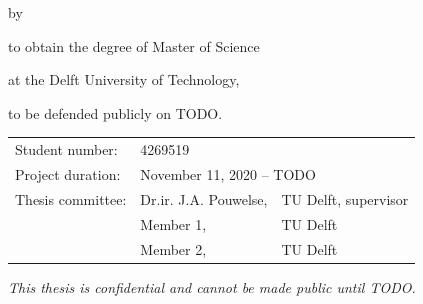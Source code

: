\documentclass[whitelogo]{tudelft-report}
\begin{document}
\begin{titlepage}

\begin{center}


{\makeatletter
\largetitlestyle\fontsize{64}{94}\selectfont\@title
\makeatother}

{\makeatletter
\ifx\@subtitle\undefined\else
    \bigskip
   {\tudsffamily\fontsize{22}{32}\selectfont\@subtitle}
\fi
\makeatother}

\bigskip
\bigskip

by

\bigskip
\bigskip

{\makeatletter
\largetitlestyle\fontsize{26}{26}\selectfont\@author
\makeatother}

\bigskip
\bigskip

to obtain the degree of Master of Science

at the Delft University of Technology,

to be defended publicly on TODO.

\vfill

\begin{tabular}{lll}

	    Student number: & 4269519 \\
    	    Project duration: & \multicolumn{2}{l}{November 11, 2020 -- TODO} \\
    	    Thesis committee:
		    	& Dr.ir. J.A. Pouwelse, & TU Delft, supervisor \\
    	    	& Member 1, & TU Delft \\
    	    	& Member 2, & TU Delft \\
    	    \end{tabular}

\bigskip
\bigskip
\emph{This thesis is confidential and cannot be made public until TODO.}


\end{center}
\end{titlepage}
\end{document}
